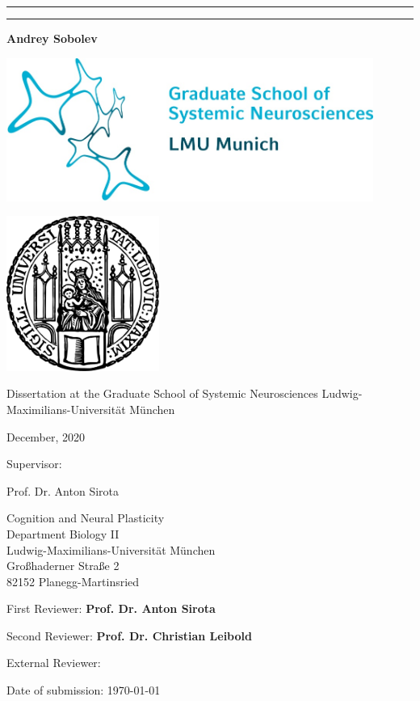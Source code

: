 \begin{titlepage}
	\centering

  \noindent\rule{15cm}{0.4pt}
  {\linespread{1.5}{\Huge Contribution of the idiothetic and the allothetic information to the hippocampal place code\par}}
  \noindent\rule{15cm}{0.4pt}

  {\LARGE \bfseries Andrey Sobolev}

  \includegraphics[width=120mm]{assets/gsn.jpg}

  \includegraphics[width=50mm]{assets/lmu-logo.png}

  Dissertation at the
  Graduate School of Systemic Neurosciences
	Ludwig-Maximilians-Universität München

  December, 2020

  \vfill

	\begin{flushleft}
	{\large Supervisor:}

	{\LARGE Prof. Dr. Anton Sirota\par}
    Cognition and Neural Plasticity\\
    Department Biology II\\
    Ludwig-Maximilians-Universität München\\
    Großhaderner Straße 2\\
    82152 Planegg-Martinsried

	\vspace{1in}

	{\large First Reviewer:   \bfseries Prof. Dr. Anton Sirota\par}
	{\large Second Reviewer:  \bfseries Prof. Dr. Christian Leibold\par}
	{\large External Reviewer:\par}

  \vspace{1in}

	{\large Date of submission: \today\par}
	\end{flushleft}

\end{titlepage}
